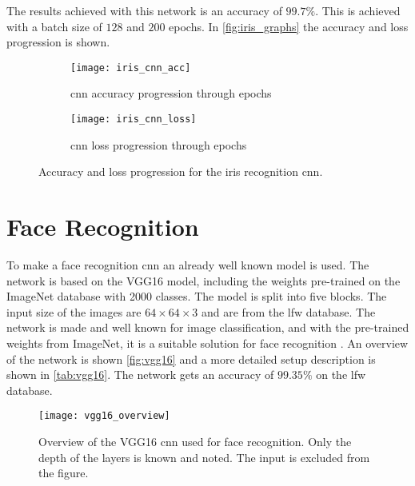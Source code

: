 The results achieved with this network is an accuracy of $99.7\%$. This is achieved with a batch size of $128$ and $200$ epochs. In \autoref{fig:iris_graphs} the accuracy and loss progression is shown.

\begin{figure}[H]
	\centering
	\begin{subfigure}{0.48\textwidth}
		\centering
		\texttt{[image: iris\_cnn\_acc]}
		\caption{\gls{cnn} accuracy progression through epochs}
		\label{fig:iris_cnn_acc}
	\end{subfigure}
	\begin{subfigure}{0.48\textwidth}
		\centering
		\texttt{[image: iris\_cnn\_loss]}
		\caption{\gls{cnn} loss progression through epochs}
		\label{fig:iris_cnn_loss}
	\end{subfigure}
	\caption{Accuracy and loss progression for the iris recognition \gls{cnn}.}
	\label{fig:iris_graphs}
\end{figure}

\section{Face Recognition}
To make a face recognition \gls{cnn} an already well known model is used. The network is based on the VGG16 model, including the weights pre-trained on the ImageNet database with 2000 classes. The model is split into five blocks. The input size of the images are $64\times64\times3$ and are from the \gls{lfw} database. The network is made and well known for image classification, and with the pre-trained weights from ImageNet, it is a suitable solution for face recognition \citep{Simonyan2015}.
An overview of the network is shown \autoref{fig:vgg16} and a more detailed setup description is shown in \autoref{tab:vgg16}. The network gets an accuracy of $99.35\%$ on the \gls{lfw} database.

\begin{figure}[H]
	\centering
	\texttt{[image: vgg16\_overview]}
	\caption{Overview of the VGG16 \gls{cnn} used for face recognition. Only the depth of the layers is known and noted. The input is excluded from the figure.}
	\label{fig:vgg16}
\end{figure}

